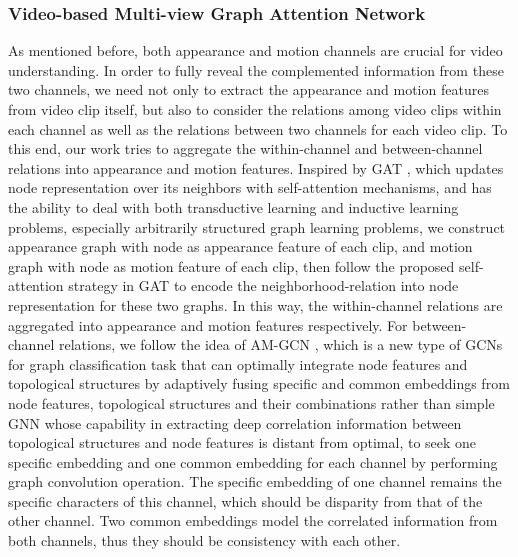 \documentclass[journal]{IEEEtran}
\begin{document}
\subsubsection{Video-based Multi-view Graph Attention Network}
As mentioned before, both appearance and motion channels are crucial for video understanding. In order to fully reveal the complemented information from these two channels, we need not only to extract the appearance and motion features from video clip itself, but also to consider the relations among video clips within each channel as well as the relations between two channels for each video clip. To this end, our work tries to aggregate the within-channel and between-channel relations into appearance and motion features. Inspired by GAT \cite{velivckovic2017graph}, which updates node representation over its neighbors with self-attention mechanisms, and has the ability to deal with both transductive learning and inductive learning problems, especially arbitrarily structured graph learning problems, we construct appearance graph with node as appearance feature of each clip, and motion graph with node as motion feature of each clip, then follow the proposed self-attention strategy in GAT to encode the neighborhood-relation into node representation for these two graphs. In this way, the within-channel relations are aggregated into appearance and motion features respectively. For between-channel relations, we follow the idea of AM-GCN \cite{wang2020gcn}, which is a new type of GCNs for graph classification task that can optimally integrate node features and topological structures by adaptively fusing specific and common embeddings from node features, topological structures and their combinations rather than simple GNN whose capability in extracting deep correlation information between topological structures and node features is distant from optimal, to seek one specific embedding and one common embedding for each channel by performing graph convolution operation. The specific embedding of one channel remains the specific characters of this channel, which should be disparity from that of the other channel. Two common embeddings model the correlated information from both channels, thus they should be consistency with each other.
\end{document}
